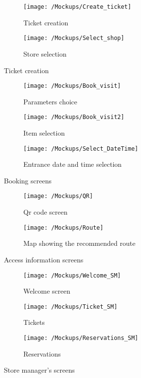 \begin{figure}[h]
	\begin{subfigure}{.5\textwidth}
		\centering
		\texttt{[image: /Mockups/Create\_ticket]}
		\caption{Ticket creation}
		\label{sub_ticket_creation}
	\end{subfigure}
	\begin{subfigure}{.5\textwidth}
		\centering
		\texttt{[image: /Mockups/Select\_shop]}
		\caption{Store selection}
		\label{sub_store_sel}
	\end{subfigure}
	\caption{Ticket creation}
	\label{ticket_creation}
\end{figure}

\begin{figure}[h]
	\begin{subfigure}{.33\textwidth}
		\centering
		\texttt{[image: /Mockups/Book\_visit]}
		\caption{Parameters choice}
		\label{params}
	\end{subfigure}
	\begin{subfigure}{.33\textwidth}
		\centering
		\texttt{[image: /Mockups/Book\_visit2]}
		\caption{Item selection}
		\label{items}
	\end{subfigure}
	\begin{subfigure}{.33\textwidth}
		\centering
		\texttt{[image: /Mockups/Select\_DateTime]}
		\caption{Entrance date and time selection}
		\label{entrancedt}
	\end{subfigure}
	\caption{Booking screens}
	\label{booking}
\end{figure}


\begin{figure}[h]
	\begin{subfigure}{.5\textwidth}
		\centering
		\texttt{[image: /Mockups/QR]}
		\caption{Qr code screen}
		\label{qr_show}
	\end{subfigure}
	\begin{subfigure}{.5\textwidth}
		\centering
		\texttt{[image: /Mockups/Route]}
		\caption{Map showing the recommended route}
		\label{route_show}
	\end{subfigure}
	\caption{Access information screens}
	\label{access}
\end{figure}

\begin{figure}[h]
	\begin{subfigure}{.33\textwidth}
		\centering
		\texttt{[image: /Mockups/Welcome\_SM]}
		\caption{Welcome screen}
		\label{sm_welcome}
	\end{subfigure}
	\begin{subfigure}{.33\textwidth}
		\centering
		\texttt{[image: /Mockups/Ticket\_SM]}
		\caption{Tickets}
		\label{sm_tick}
	\end{subfigure}
	\begin{subfigure}{.33\textwidth}
		\centering
		\texttt{[image: /Mockups/Reservations\_SM]}
		\caption{Reservations}
		\label{sm_reserv}
	\end{subfigure}
	\caption{Store manager's screens}
	\label{sm}
\end{figure}
\clearpage
